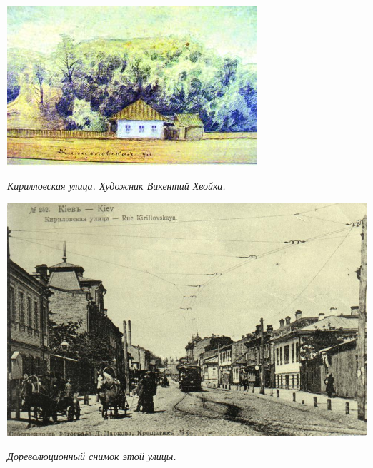 
\newpage
\vspace*{\fill}
\begin{center}
\includegraphics[width=\linewidth]{chast-kirvys/predvaritelno/hv-ris.png}

\textit{Кирилловская улица. Художник Викентий Хвойка.}
\end{center}

\begin{center}
\includegraphics[width=\linewidth]{chast-kirvys/predvaritelno/kirillovskaya-dorevol.jpg}

\textit{Дореволюционный снимок этой улицы.}
\end{center}
\vspace*{\fill}
\newpage

